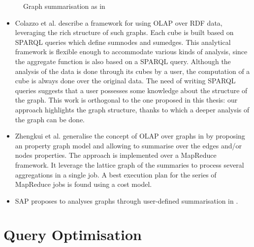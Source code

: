 \begin{figure}
	\centering
	\resizebox{.5\textwidth}{!}{
		
	}
	\caption{Graph summarisation as in \cite{zhao:sigmod:2011}}
	\label{fig:graph-cube}
\end{figure}

\begin{itemize}
\item Colazzo et al. \cite{colazzo:www:2014} describe a framework for using OLAP over RDF data, leveraging the rich structure of such graphs. Each cube is built based on SPARQL queries which define sumnodes and sumedges. This analytical framework is flexible enough to accommodate various kinds of analysis, since the aggregate function is also based on a SPARQL query. Although the analysis of the data is done through its cubes by a user, the computation of a cube is always done over the original data. The need of writing SPARQL queries suggests that a user possesses some knowledge about the structure of the graph. This work is orthogonal to the one proposed in this thesis: our approach highlights the graph structure, thanks to which a deeper analysis of the graph can be done.
\item Zhengkui et al. generalise the concept of OLAP over graphs in \cite{zhengkui:2014:ppg} by proposing an property graph model and allowing to summarise over the edges and/or nodes properties. The approach is implemented over a MapReduce framework. It leverage the lattice graph of the summaries to process several aggregations in a single job. A best execution plan for the series of MapReduce jobs is found using a cost model.
\item SAP proposes to analyses graphs through user-defined summarisation in \cite{rudolf:2013:slg}.
\end{itemize}

\section{Query Optimisation}
\label{chap03:review:query-optim}

